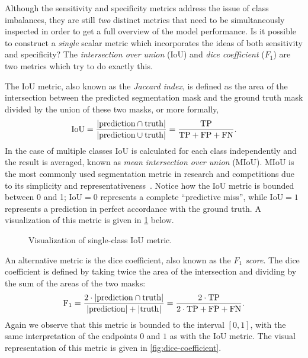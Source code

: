 Although the sensitivity and specificity metrics address the issue of class imbalances, they are still \textit{two} distinct metrics that need to be simultaneously inspected in order to get a full overview of the model performance.
Is it possible to construct a \textit{single} scalar metric which incorporates the ideas of both sensitivity and specificity?
The \textit{intersection over union} (IoU) and \textit{dice coefficient} ($F_1$) are two metrics which try to do exactly this.

The IoU metric, also known as the \textit{Jaccard index}, is defined as the area of the intersection between the predicted segmentation mask and the ground truth mask divided by the union of these two masks, or more formally,
%
\begin{equation*}
  \mathrm{IoU}
  =
  \frac{%
    |\mathrm{prediction} \cap \mathrm{truth}|
  }{%
    |\mathrm{prediction} \cup \mathrm{truth}|
  }
  =
  \frac{%
    \mathrm{TP}
  }{%
    \mathrm{TP} + \mathrm{FP} + \mathrm{FN}
  }.
\end{equation*}
%
In the case of multiple classes IoU is calculated for each class independently and the result is averaged, known as \textit{mean intersection over union} (MIoU).
MIoU is the most commonly used segmentation metric in research and competitions due to its simplicity and representativeness~\cite{segmentation-overview}.
Notice how the IoU metric is bounded between 0 and 1; $\mathrm{IoU} = 0$ represents a complete \enquote{predictive miss}, while $\mathrm{IoU} = 1$ represents a prediction in perfect accordance with the ground truth.
A visualization of this metric is given in \cref{fig:iou-metric} below.

\begin{figure}[H]
  \centering
  
  \caption{%
    Visualization of single-class IoU metric.
  }%
  \label{fig:iou-metric}
\end{figure}

An alternative metric is the dice coefficient, also known as the \textit{$F_1$ score}.
The dice coefficient is defined by taking twice the area of the intersection and dividing by the sum of the areas of the two masks:
%
\begin{equation*}
  \mathrm{F_1}
  =
  \frac{%
    2 \cdot |\mathrm{prediction} \cap \mathrm{truth}|
  }{%
    |\mathrm{prediction}| + |\mathrm{truth}|
  }
  =
  \frac{%
    \mathrm{2 \cdot TP}
  }{%
    2 \cdot \mathrm{TP} + \mathrm{FP} + \mathrm{FN}
  }.
\end{equation*}
%
Again we observe that this metric is bounded to the interval $[0, 1]$, with the same interpretation of the endpoints $0$ and $1$ as with the IoU metric.
The visual representation of this metric is given in \cref{fig:dice-coefficient}.

